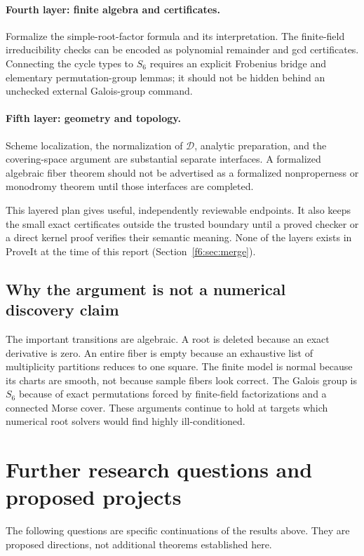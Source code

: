 \documentclass[11pt,a4paper]{article}
\theoremstyle{definition}
\newcommand{\dd}{\mathcal D}
\begin{document}
\paragraph{Fourth layer: finite algebra and certificates.} Formalize the
simple-root-factor formula and its interpretation. The finite-field
irreducibility checks can be encoded as polynomial remainder and gcd
certificates. Connecting the cycle types to $S_6$ requires an explicit
Frobenius bridge and elementary permutation-group lemmas; it should not be
hidden behind an unchecked external Galois-group command.

\paragraph{Fifth layer: geometry and topology.} Scheme localization, the
normalization of $\dd$, analytic preparation, and the covering-space argument
are substantial separate interfaces. A formalized algebraic fiber theorem
should not be advertised as a formalized nonproperness or monodromy theorem
until those interfaces are completed.

This layered plan gives useful, independently reviewable endpoints. It also
keeps the small exact certificates outside the trusted boundary until a
proved checker or a direct kernel proof verifies their semantic meaning.
None of the layers exists in ProveIt at the time of this report
(Section~\ref{f6:sec:merge}).

\subsection{Why the argument is not a numerical discovery claim}
The important transitions are algebraic. A root is deleted because an
exact derivative is zero. An entire fiber is empty because an exhaustive
list of multiplicity partitions reduces to one square. The finite model
is normal because its charts are smooth, not because sample fibers look
correct. The Galois group is $S_6$ because of exact permutations forced
by finite-field factorizations and a connected Morse cover. These
arguments continue to hold at targets which numerical root solvers
would find highly ill-conditioned.

\section{Further research questions and proposed projects}
\label{f6:sec:future}
The following questions are specific continuations of the results above.
They are proposed directions, not additional theorems established here.
\end{document}
